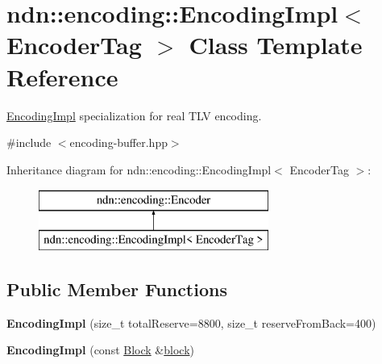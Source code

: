 \hypertarget{classndn_1_1encoding_1_1EncodingImpl_3_01EncoderTag_01_4}{}\section{ndn\+:\+:encoding\+:\+:Encoding\+Impl$<$ Encoder\+Tag $>$ Class Template Reference}
\label{classndn_1_1encoding_1_1EncodingImpl_3_01EncoderTag_01_4}


\hyperlink{classndn_1_1encoding_1_1EncodingImpl}{Encoding\+Impl} specialization for real T\+LV encoding.  




{\ttfamily \#include $<$encoding-\/buffer.\+hpp$>$}

Inheritance diagram for ndn\+:\+:encoding\+:\+:Encoding\+Impl$<$ Encoder\+Tag $>$\+:\begin{figure}[H]
\begin{center}
\leavevmode
\includegraphics[height=2.000000cm]{classndn_1_1encoding_1_1EncodingImpl_3_01EncoderTag_01_4}
\end{center}
\end{figure}
\subsection*{Public Member Functions}
\begin{DoxyCompactItemize}
\item 
{\bfseries Encoding\+Impl} (size\+\_\+t total\+Reserve=8800, size\+\_\+t reserve\+From\+Back=400)\hypertarget{classndn_1_1encoding_1_1EncodingImpl_3_01EncoderTag_01_4_af3435aeb192aeba51ad23be20586f753}{}\label{classndn_1_1encoding_1_1EncodingImpl_3_01EncoderTag_01_4_af3435aeb192aeba51ad23be20586f753}

\item 
{\bfseries Encoding\+Impl} (const \hyperlink{classndn_1_1Block}{Block} \&\hyperlink{classndn_1_1encoding_1_1Encoder_a37a3f9744f1fe2be7b35a5fd7827bd3b}{block})\hypertarget{classndn_1_1encoding_1_1EncodingImpl_3_01EncoderTag_01_4_ab781cdf205ff30709e975e3d50ea3cba}{}\label{classndn_1_1encoding_1_1EncodingImpl_3_01EncoderTag_01_4_ab781cdf205ff30709e975e3d50ea3cba}

\end{DoxyCompactItemize}
